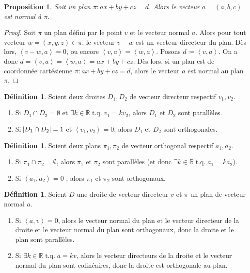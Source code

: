 \documentclass{article}
\DeclareMathOperator{\tq}{\text{ t.q. }}
\newcommand{\R}{\mathbb R}
\newcommand{\scpr}[2]{\left\langle #1, #2\right\rangle}
\newtheorem{prp}[thm]{Proposition}
\theoremstyle{definition}
\newtheorem{déf}[thm]{Définition}
\theoremstyle{remark}
\begin{document}
		\begin{prp} Soit un plan $\pi : ax + by + cz = d$. Alors le vecteur $a = (a, b, c)$ est normal à $\pi$. \end{prp}

		\begin{proof} Soit $\pi$ un plan défini par le point $v$ et le vecteur normal $a$. Alors pour tout vecteur $w = (x, y, z) \in \pi$, le vecteur $v-w$ est un vecteur
		directeur du plan. Dès lors, $\scpr {v-w}a = 0$, ou encore $\scpr va = \scpr wa$. Posons $d \coloneqq \scpr va$. On a donc $d = \scpr va = \scpr wa = ax+by+cz$.
		Dès lors, si un plan est de coordonnée cartésienne $\pi : ax + by + cz = d$, alors le vecteur $a$ est normal au plan $\pi$. \end{proof}

		\begin{déf} Soient deux droites $D_1, D_2$ de vecteur directeur respectif $v_1, v_2$.
		\begin{enumerate}
			\item Si $D_1 \cap D_2 = \emptyset$ et $\exists k \in \R \tq v_1 = kv_2$, alors $D_1$ et $D_2$ sont parallèles.
			\item Si $\abs{D_1 \cap D_2} = 1$ et $\scpr {v_1}{v_2} = 0$, alors $D_1$ et $D_2$ sont orthogonales.
		\end{enumerate}
		\end{déf}

		\begin{déf} Soient deux plans $\pi_1, \pi_2$ de vecteur orthogonal respectif $a_1, a_2$.
		\begin{enumerate}
			\item Si $\pi_1 \cap \pi_2 = \emptyset$, alors $\pi_1$ et $\pi_2$ sont parallèles (et donc $\exists k \in \R \tq a_1 = ka_2$).
			\item Si $\scpr {a_1}{a_2} = 0$ , alors $\pi_1$ et $\pi_2$ sont orthogonaux.
		\end{enumerate}
		\end{déf}

		\begin{déf} Soient $D$ une droite de vecteur directeur $v$ et $\pi$ un plan de vecteur normal $a$.
		\begin{enumerate}
			\item Si $\scpr av = 0$, alors le vecteur normal du plan et le vecteur directeur de la droite et le vecteur normal du plan sont orthogonaux, donc la droite et le
			      plan sont parallèles.
			\item Si $\exists k \in \R \tq a = kv$, alors le vecteur directeurs de la droite et le vecteur normal du plan sont colinéaires, donc la droite est orthogonale au plan.
		\end{enumerate}
		\end{déf}
\end{document}
